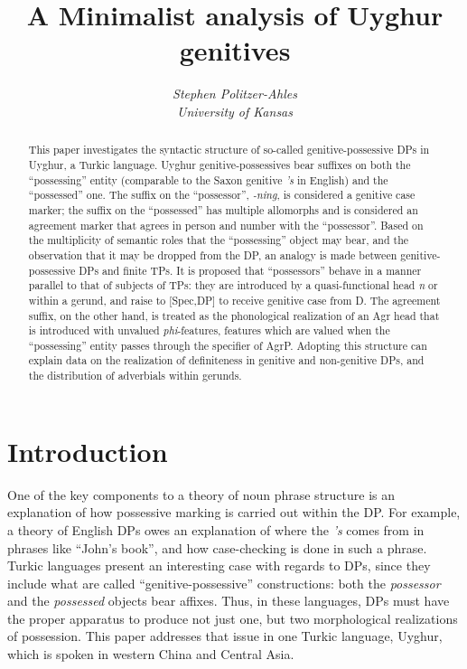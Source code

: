 \documentclass[letterpaper,12pt]{article}
\title{\large \textbf{A Minimalist analysis of Uyghur genitives}}
\author{\textit{Stephen Politzer-Ahles}\\
\textit{University of Kansas}}
\date{}
\begin{document}
\maketitle

\thispagestyle{empty}
\pagestyle{empty}


\begin{abstract}
\noindent This paper investigates the syntactic structure of so-called genitive-possessive DPs in Uyghur, a Turkic language. Uyghur genitive-possessives bear suffixes on both the ``possessing'' entity (comparable to the Saxon genitive \emph{'s} in English)
and the ``possessed'' one. The suffix on the ``possessor'', \textsl{-ning}, is considered a genitive case marker; the suffix on the ``possessed'' has multiple allomorphs and is considered an agreement marker that agrees in person and number with the ``possessor''. Based on the multiplicity of semantic roles that the ``possessing'' object may bear, and the observation that it may be dropped from the DP, an analogy is made between genitive-possessive DPs and finite TPs. It is
proposed that ``possessors'' behave in a manner parallel to that of subjects of TPs: they are introduced by a quasi-functional
head \textit{n} or within a gerund, and raise to [Spec,DP] to receive genitive case from D. The agreement suffix, on the other hand, is treated as the phonological realization of an Agr head that is introduced with unvalued \emph{phi}-features, features
which are valued when the ``possessing'' entity passes through the specifier of AgrP. Adopting this structure can explain data on the realization of definiteness in genitive and non-genitive DPs, and the distribution of adverbials within gerunds.
\end{abstract}

\section*{Introduction}
One of the key components to a theory of noun phrase structure is an explanation of how possessive marking is carried out within the DP. For example, a theory of
English DPs owes an explanation of where the \textit{'s} comes from in phrases like ``John's book'', and how case-checking is done in such a phrase. Turkic
languages present an interesting case with regards to DPs, since they include what are called ``genitive-possessive'' constructions: both the \textit{possessor} and the
\textit{possessed} objects bear affixes. Thus, in these languages, DPs must have the proper apparatus to produce not just one, but two morphological realizations of possession. This paper addresses that issue in one Turkic language, Uyghur, which is spoken in western China and Central Asia. 
\end{document}
